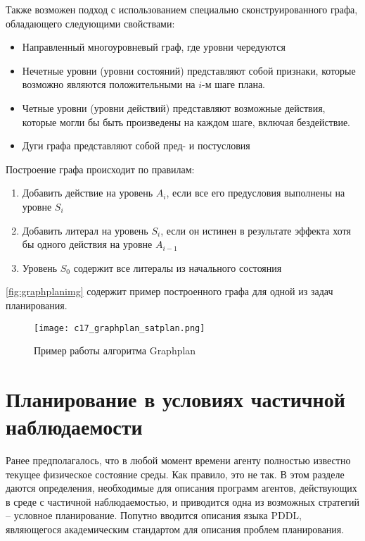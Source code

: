 Также возможен подход с использованием специально сконструированного графа, обладающего следующими свойствами:

\begin{itemize}
 \item Направленный многоуровневый граф, где уровни чередуются
 \item Нечетные уровни (уровни состояний) представляют собой признаки, которые возможно являются положительными на $i$-м шаге плана.
 \item Четные уровни (уровни действий) представляют возможные действия, которые могли бы быть произведены на каждом шаге, включая бездействие.
 \item Дуги графа представляют собой пред- и постусловия
\end{itemize}

Построение графа происходит по правилам:

\begin{enumerate}
 \item Добавить действие на уровень $A_i$, если все его предусловия выполнены на уровне $S_i$
 \item Добавить литерал на уровень $S_i$, если он истинен в результате эффекта хотя бы одного действия на уровне $A_{i-1}$
 \item Уровень $S_0$ содержит все литералы из начального состояния
\end{enumerate}

\autoref{fig:graphplanimg} содержит пример построенного графа для одной из задач планирования.

\begin{figure}[H]
 \centering
 \texttt{[image: c17\_graphplan\_satplan.png]}
 \caption{Пример работы алгоритма Graphplan}
 \label{fig:graphplanimg}
\end{figure}

\section{Планирование в условиях частичной наблюдаемости}

Ранее предполагалось, что в любой момент времени агенту полностью известно текущее физическое состояние среды. Как правило, это не так. В этом разделе даются определения, необходимые для описания программ агентов, действующих в среде с частичной наблюдаемостью, и приводится одна из возможных стратегий -- условное планирование. Попутно вводится описания языка PDDL, являющегося академическим стандартом для описания проблем планирования.

